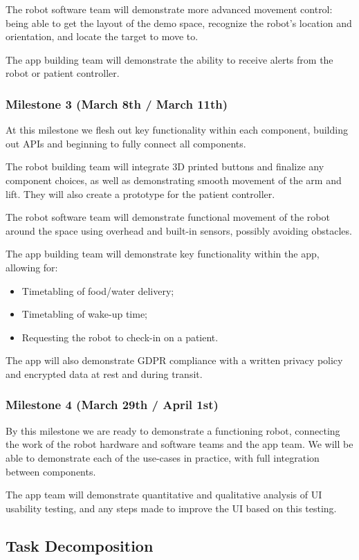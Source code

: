 \documentclass{article}
\begin{document}
The robot software team will demonstrate more advanced movement control: being able to get the layout of the demo space, recognize the robot's location and orientation, and locate the target to move to. 

The app building team will demonstrate the ability to receive alerts from the robot or patient controller. 

\subsubsection{Milestone 3 (March 8th / March 11th)}
At this milestone we flesh out key functionality within each component, building out APIs and beginning to fully connect all components. 

The robot building team will integrate 3D printed buttons and finalize any component choices, as well as demonstrating smooth movement of the arm and lift. They will also create a prototype for the patient controller. 

The robot software team will demonstrate functional movement of the robot around the space using overhead and built-in sensors, possibly avoiding obstacles. 

The app building team will demonstrate key functionality within the app, allowing for:
\begin{itemize}
\item Timetabling of food/water delivery;
\item Timetabling of wake-up time;
\item Requesting the robot to check-in on a patient.
\end{itemize}
The app will also demonstrate GDPR compliance with a written privacy policy and encrypted data at rest and during transit.

\subsubsection{Milestone 4 (March 29th / April 1st)}
By this milestone we are ready to demonstrate a functioning robot, connecting the work of the robot hardware and software teams and the app team. We will be able to demonstrate each of the use-cases in practice, with full integration between components.

The app team will demonstrate quantitative and qualitative analysis of UI usability testing, and any steps made to improve the UI based on this testing.

\subsection{Task Decomposition}
\end{document}
